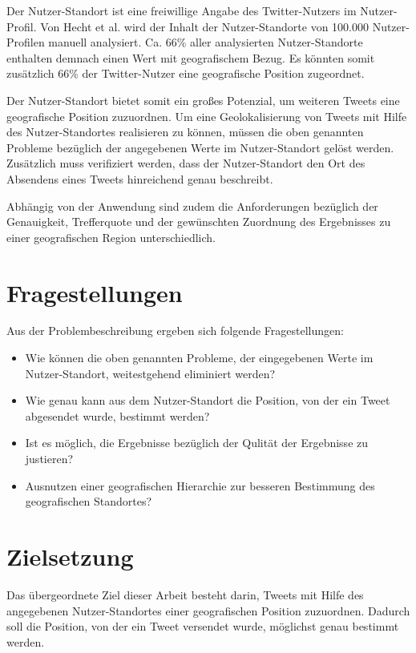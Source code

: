 		Der Nutzer-Standort ist eine freiwillige Angabe des Twitter-Nutzers im Nutzer-Profil. 
		Von Hecht et al. \cite{Hecht2011} wird der Inhalt der Nutzer-Standorte von 100.000 Nutzer-Profilen manuell analysiert.
	    Ca. 66\% aller analysierten Nutzer-Standorte enthalten demnach einen Wert mit geografischem Bezug.
	    Es könnten somit zusätzlich 66\% der Twitter-Nutzer eine geografische Position zugeordnet. 

	    Der Nutzer-Standort bietet somit ein großes Potenzial, um weiteren Tweets eine geografische Position zuzuordnen.
	    Um eine Geolokalisierung von Tweets mit Hilfe des Nutzer-Standortes realisieren zu können, müssen die oben genannten Probleme bezüglich der angegebenen Werte im Nutzer-Standort gelöst werden.
	    Zusätzlich muss verifiziert werden, dass der Nutzer-Standort den Ort des Absendens eines Tweets hinreichend genau beschreibt.

	    Abhängig von der Anwendung sind zudem die Anforderungen bezüglich der Genauigkeit, Trefferquote und der gewünschten Zuordnung des Ergebnisses zu einer geografischen Region unterschiedlich. 

	    \newpage

	  \section{Fragestellungen}

	  	Aus der Problembeschreibung ergeben sich folgende Fragestellungen:  

	  	\begin{itemize}
	  		\item Wie können die oben genannten Probleme, der eingegebenen Werte im Nutzer-Standort, weitestgehend eliminiert werden?
	  		\item Wie genau kann aus dem Nutzer-Standort die Position, von der ein Tweet abgesendet wurde, bestimmt werden? 
			\item Ist es möglich, die Ergebnisse bezüglich der Qulität der Ergebnisse zu justieren?
			\item Ausnutzen einer geografischen Hierarchie zur besseren Bestimmung des geografischen Standortes? 
	  	\end{itemize}

	\section{Zielsetzung} 

		Das übergeordnete Ziel dieser Arbeit besteht darin, Tweets mit Hilfe des angegebenen Nutzer-Standortes einer geografischen Position zuzuordnen.
		Dadurch soll die Position, von der ein Tweet versendet wurde, möglichst genau bestimmt werden.

